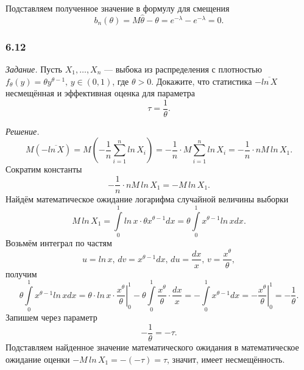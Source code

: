 Подставляем полученное значение в формулу для смещения
$$b_n \left( \theta \right) =
  M \hat{ \theta } - \theta =
  e^{- \lambda } - e^{- \lambda } =
  0.$$

\subsubsection*{6.12}

\textit{Задание.}
Пусть $X_1, \dotsc, X_n$ ---
выбока из распределения с плотностью
$f_{ \theta } \left( y \right) = \theta y^{ \theta - 1}, \,
  y \in \left( 0, 1 \right) $,
где $ \theta > 0$.
Докажите, что статистика $- \overline{ln \, X}$ несмещённая и эффективная оценка для параметра
$$ \tau =
  \frac{1}{ \theta }.$$

\textit{Решение.}
$$M \left( - \overline{ln \, X} \right) =
  M \left( - \frac{1}{n} \sum \limits_{i = 1}^n ln \, X_i \right) =
  - \frac{1}{n} \cdot M \sum \limits_{i = 1}^n ln \, X_i =
  - \frac{1}{n} \cdot nM \, ln \, X_1.$$
Сократим константы
$$- \frac{1}{n} \cdot nM \, ln \, X_1 =
  -M \, ln \, X_1.$$
Найдём математическое ожидание логарифма случайной величины выборки
$$M \, ln \, X_1 =
  \int \limits_0^1 ln \, x \cdot \theta x^{ \theta - 1} dx =
  \theta \int \limits_0^1 x^{ \theta - 1} ln \, x dx.$$
Возьмём интеграл по частям
$$u = ln \, x, \,
  dv = x^{ \theta - 1} dx, \,
  du = \frac{dx}{x}, \,
  v = \frac{x^{ \theta }}{ \theta },$$
получим
$$ \theta \int \limits_0^1 x^{ \theta - 1} ln \, x dx =
  \theta \cdot \left. ln \, x \cdot \frac{x^{ \theta }}{ \theta } \right|_0^1 -
  \theta \int \limits_0^1 \frac{x^{ \theta }}{ \theta } \cdot \frac{dx}{x} =
  - \int \limits_0^1 x^{ \theta - 1} dx =
  - \left. \frac{x^{ \theta }}{ \theta } \right|_0^1 =
  - \frac{1}{ \theta }.$$
Запишем через параметр
$$- \frac{1}{ \theta } =
  - \tau.$$
Подставляем найденное значение математического ожидания в математическое ожидание оценки
$-M \, ln \, X_1 =
  - \left( - \tau \right) =
  \tau $,
значит, имеет несмещённость.

